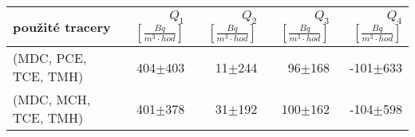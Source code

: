 \begin{tabular}{lrrrr}
\toprule
použité tracery & $Q_1$ $\left[\si{\frac{Bq}{m^3\cdot hod}}\right]$ & $Q_2$ $\left[\si{\frac{Bq}{m^3\cdot hod}}\right]$ & $Q_3$ $\left[\si{\frac{Bq}{m^3\cdot hod}}\right]$ & $Q_4$ $\left[\si{\frac{Bq}{m^3\cdot hod}}\right]$ \\
\midrule
(MDC, PCE, TCE, TMH) &   404$\pm$403 &     11$\pm$244 &       96$\pm$168 &   -101$\pm$633 \\
(MDC, MCH, TCE, TMH) &   401$\pm$378 &     31$\pm$192 &      100$\pm$162 &   -104$\pm$598 \\
\bottomrule
\end{tabular}
